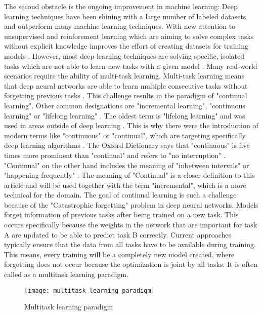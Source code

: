 The second obstacle is the ongoing improvement in machine learning:
\hfill \break
Deep learning techniques have been shining with a large number of labeled datasets and outperform many machine learning techniques.
With new attention to unsupervised and reinforement learning which are aiming to solve complex tasks without explicit knowledge improves the effort of creating datasets for training models \cite{continual-ai-blog, alphastar}.
However, most deep learning techniques are solving specific, isolated tasks which are not able to learn new tasks with a given model \cite{continual-ai-blog}.
Many real-world scenarios require the ability of multi-task learning.
Multi-task learning means that deep neural networks are able to learn multiple consecutive tasks without forgetting previous tasks \cite{elastic-weight-consolidation}.
This challenge results in the paradigm of "continual learning".
Other common designations are "incremental learning", "continuous learning" or "lifelong learning" \cite{lifelong-machine-learning-book, continual-ai-blog}.
The oldest term is "lifelong learning" and was used in areas outside of deep learning \cite{continual-ai-blog}.
This is why there were the introduction of modern terms like "continuous" or "continual", which are targeting specifically deep learning algorithms \cite{continual-ai-blog}.
The Oxford Dictionary says that "continuous" is five times more prominent than "continual" and refers to "no interruption" \cite{oxford-continual-continuous}. "Continual" on the other hand includes the meaning of "inbetween intervals" or "happening frequently" \cite{oxford-continual-continuous}.
The meaning of "Continual" is a closer definition to this article and will be used together with the term "incremental", which is a more technical for the domain.
\hfill \break
The goal of continual learning is such a challenge because of the "Catastrophic forgetting" problem in deep neural networks.
Models forget information of previous tasks after being trained on a new task.
This occurs specifically because the weights in the network that are important for task A are updated to be able to predict task B correctly.
Current approaches typically ensure that the data from all tasks have to be available during training.
This means, every training will be a completely new model created, where forgetting does not occur because the optimization is joint by all tasks.
It is often called as a multitask learning paradigm.
\cite{incremental-moment-matching, continual-ai-blog}

\begin{figure}[H]
    \centering
    \texttt{[image: multitask\_learning\_paradigm]}
    \caption{Multitask learning paradigm}
    \label{fig:intro_motivation_multitask_learning_paradigm}
\end{figure}


